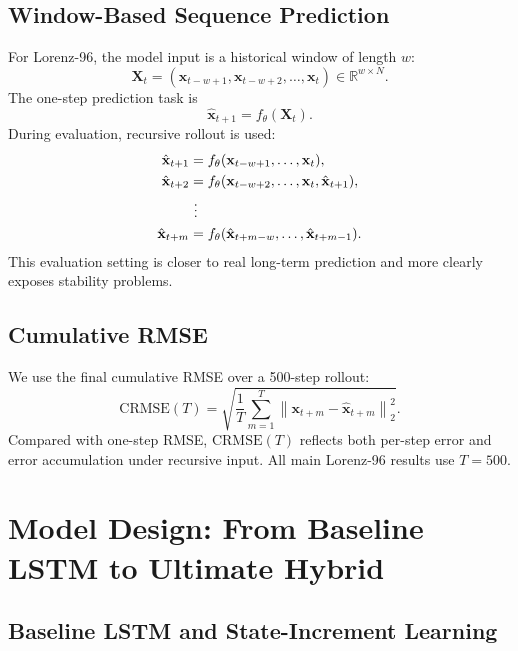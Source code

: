 \documentclass[a4paper,12pt]{article}
\newcommand{\xvec}{\mathbf{x}}
\newcommand{\crmse}{\mathrm{CRMSE}}
\begin{document}
\subsection{Window-Based Sequence Prediction}

For Lorenz-96, the model input is a historical window of length $w$:
\begin{equation}
\mathbf{X}_t=(\xvec_{t-w+1},\xvec_{t-w+2},\dots,\xvec_t)\in \mathbb{R}^{w\times N}.
\end{equation}
The one-step prediction task is
\begin{equation}
\hat{\xvec}_{t+1}=f_\theta(\mathbf{X}_t).
\end{equation}
During evaluation, recursive rollout is used:
\begin{align}
\hat{\xvec}_{t+1} &= f_\theta(\xvec_{t-w+1},\dots,\xvec_t),\\
\hat{\xvec}_{t+2} &= f_\theta(\xvec_{t-w+2},\dots,\xvec_t,\hat{\xvec}_{t+1}),\\
&\ \vdots \notag\\
\hat{\xvec}_{t+m} &= f_\theta(\hat{\xvec}_{t+m-w},\dots,\hat{\xvec}_{t+m-1}).
\end{align}
This evaluation setting is closer to real long-term prediction and more clearly exposes stability problems.

\subsection{Cumulative RMSE}

We use the final cumulative RMSE over a 500-step rollout:
\begin{equation}
\crmse(T)=
\sqrt{
\frac{1}{T}\sum_{m=1}^{T}
\left\|\xvec_{t+m}-\hat{\xvec}_{t+m}\right\|_2^2
}.
\end{equation}
Compared with one-step RMSE, $\crmse(T)$ reflects both per-step error and error accumulation under recursive input. All main Lorenz-96 results use $T=500$.

\section{Model Design: From Baseline LSTM to Ultimate Hybrid}

\subsection{Baseline LSTM and State-Increment Learning}
\end{document}
